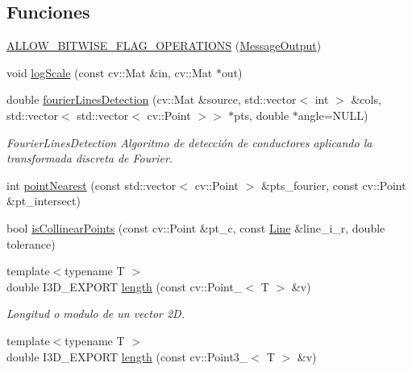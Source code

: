 \subsection*{Funciones}
\begin{DoxyCompactItemize}
\item 
\hyperlink{namespace_i3_d_a67374982e3085e082db07f2941c693a0}{A\+L\+L\+O\+W\+\_\+\+B\+I\+T\+W\+I\+S\+E\+\_\+\+F\+L\+A\+G\+\_\+\+O\+P\+E\+R\+A\+T\+I\+O\+NS} (\hyperlink{namespace_i3_d_a2ccb65ac6e08844c1175a235107fa103}{Message\+Output})
\item 
void \hyperlink{namespace_i3_d_a61642b345ce36927fc6694a81d6540f7}{log\+Scale} (const cv\+::\+Mat \&in, cv\+::\+Mat $\ast$out)
\item 
double \hyperlink{namespace_i3_d_a83df44c7261ddd174a2bcdaaa6935552}{fourier\+Lines\+Detection} (cv\+::\+Mat \&source, std\+::vector$<$ int $>$ \&cols, std\+::vector$<$ std\+::vector$<$ cv\+::\+Point $>$$>$ $\ast$pts, double $\ast$angle=N\+U\+LL)
\begin{DoxyCompactList}\small\item\em Fourier\+Lines\+Detection Algoritmo de detección de conductores aplicando la transformada discreta de Fourier. \end{DoxyCompactList}\item 
int \hyperlink{group___geometric_entities_ga50289ee8c51aeff4b2f4706acbabd932}{point\+Nearest} (const std\+::vector$<$ cv\+::\+Point $>$ \&pts\+\_\+fourier, const cv\+::\+Point \&pt\+\_\+intersect)
\item 
bool \hyperlink{group___geometric_entities_gaa7aa32d175a13ad9ac23bfe016754b1f}{is\+Collinear\+Points} (const cv\+::\+Point \&pt\+\_\+c, const \hyperlink{group___geometric_entities_ga483b43891a1b33d99406fdc397e9a445}{Line} \&line\+\_\+i\+\_\+r, double tolerance)
\item 
{\footnotesize template$<$typename T $>$ }\\double I3\+D\+\_\+\+E\+X\+P\+O\+RT \hyperlink{group___geometric_entities_ga6cfd96fd34bd41f5b201d69d70daa705}{length} (const cv\+::\+Point\+\_\+$<$ T $>$ \&v)
\begin{DoxyCompactList}\small\item\em Longitud o modulo de un vector 2D. \end{DoxyCompactList}\item 
{\footnotesize template$<$typename T $>$ }\\double I3\+D\+\_\+\+E\+X\+P\+O\+RT \hyperlink{group___geometric_entities_gadc4e42bc957a28f97e0d45d09d5e1db7}{length} (const cv\+::\+Point3\+\_\+$<$ T $>$ \&v)
$$
\end{DoxyCompactItemize}
